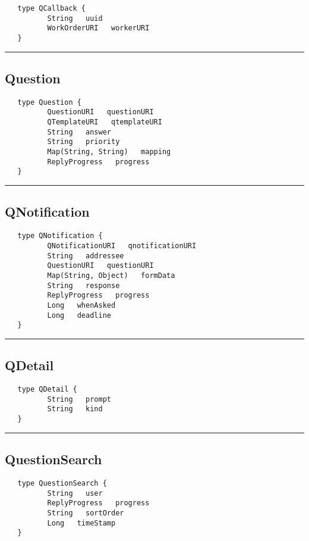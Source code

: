 \begin{verbatim}
   type QCallback {
          String   uuid
          WorkOrderURI   workerURI
   }
\end{verbatim}

\rule{15cm}{2pt}
\subsection{Question}
\label{type:Question}

\begin{verbatim}
   type Question {
          QuestionURI   questionURI
          QTemplateURI   qtemplateURI
          String   answer
          String   priority
          Map(String, String)   mapping
          ReplyProgress   progress
   }
\end{verbatim}

\rule{15cm}{2pt}
\subsection{QNotification}
\label{type:QNotification}

\begin{verbatim}
   type QNotification {
          QNotificationURI   qnotificationURI
          String   addressee
          QuestionURI   questionURI
          Map(String, Object)   formData
          String   response
          ReplyProgress   progress
          Long   whenAsked
          Long   deadline
   }
\end{verbatim}

\rule{15cm}{2pt}
\subsection{QDetail}
\label{type:QDetail}

\begin{verbatim}
   type QDetail {
          String   prompt
          String   kind
   }
\end{verbatim}

\rule{15cm}{2pt}
\subsection{QuestionSearch}
\label{type:QuestionSearch}

\begin{verbatim}
   type QuestionSearch {
          String   user
          ReplyProgress   progress
          String   sortOrder
          Long   timeStamp
   }
\end{verbatim}

